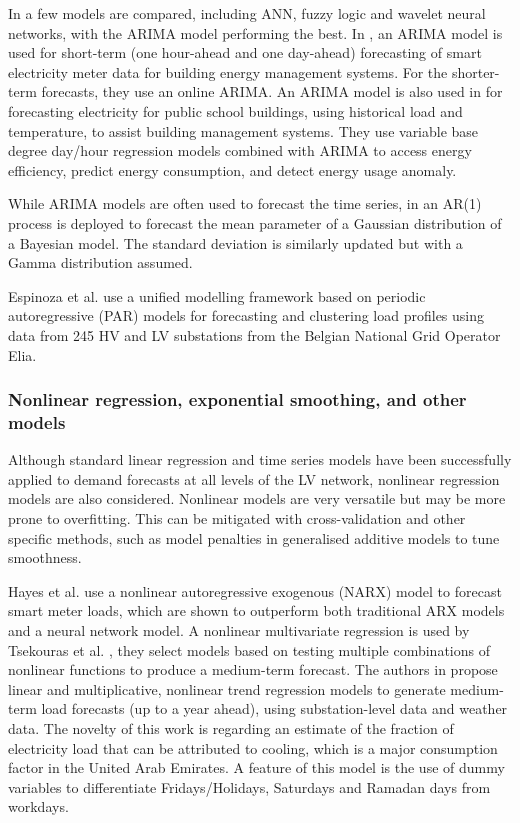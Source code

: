 In \cite{Marinescu2013RED} a few models are compared, including ANN, fuzzy logic and wavelet neural networks, with the ARIMA model performing the best. In \cite{Nugraha2018ldp}, an ARIMA model is used for short-term (one hour-ahead and one day-ahead) forecasting of smart electricity meter data for building energy management systems. For the shorter-term forecasts, they use an online ARIMA. An ARIMA model is also used in \cite{Lee2013asm} for forecasting electricity for public school buildings, using historical load and temperature, to assist building management systems. They use variable base degree day/hour regression models combined with ARIMA to access energy efficiency, predict energy consumption, and detect energy usage anomaly.

While ARIMA models are often used to forecast the time series, in \cite{Bracale2013ABB} an AR(1) process is deployed to forecast the mean parameter of a Gaussian distribution of a Bayesian model. The standard deviation is similarly updated but with a Gamma distribution assumed.


Espinoza et al. \cite{espinoza2005stl} use a unified modelling framework based on periodic autoregressive (PAR) models for forecasting and clustering load profiles using data from 245 HV and LV substations from the Belgian National Grid Operator Elia.


\subsubsection{Nonlinear regression, exponential smoothing, and other models}

Although standard linear regression and time series models have been successfully applied to demand forecasts at all levels of the LV network, nonlinear regression models are also considered. Nonlinear models are very versatile but may be more prone to overfitting. This can be mitigated with cross-validation and other specific methods, such as model penalties in generalised additive models to tune smoothness.   

Hayes et al. \cite{Hayes2015acs} use a nonlinear autoregressive exogenous (NARX) model to forecast smart meter loads, which are shown to outperform both traditional ARX models and a neural network model. A nonlinear multivariate regression is used by Tsekouras et al.  \cite{tsekouras2006anl}, they select models based on testing multiple combinations of nonlinear functions to produce a medium-term forecast. The authors in \cite{Friedrich2014mfu} propose linear and multiplicative, nonlinear trend regression models to generate medium-term load forecasts (up to a year ahead), using substation-level data and weather data. The novelty of this work is regarding an estimate of the fraction of electricity load that can be attributed to cooling, which is a major consumption factor in the United Arab Emirates. A feature of this model is the use of dummy variables to differentiate Fridays/Holidays, Saturdays and Ramadan days from workdays.

